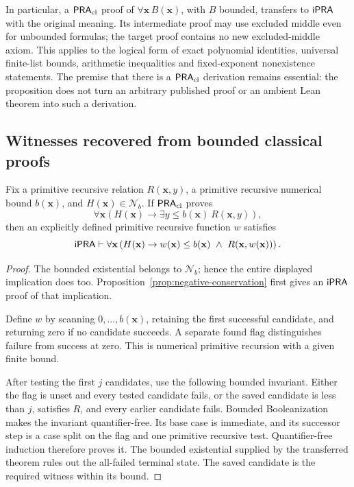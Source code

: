 In particular, a \(\mathsf{PRA}_{\mathrm{cl}}\) proof of
\(\forall\mathbf x\,B(\mathbf x)\), with \(B\) bounded, transfers to
\(\mathsf{iPRA}\) with the original meaning. Its intermediate proof may use
excluded middle even for unbounded formulas; the target proof contains no
new excluded-middle axiom. This applies to the logical form of exact
polynomial identities, universal finite-list bounds, arithmetic inequalities
and fixed-exponent nonexistence statements. The premise that there is a
\(\mathsf{PRA}_{\mathrm{cl}}\) derivation remains essential: the proposition does not turn an
arbitrary published proof or an ambient Lean theorem into such a derivation.

\subsection{Witnesses recovered from bounded classical proofs}

\begin{theorem}
\label{thm:bounded-classical-selector}
Fix a primitive recursive relation \(R(\mathbf x,y)\), a primitive
recursive numerical bound \(b(\mathbf x)\), and
\(H(\mathbf x)\in\mathcal N_b\). If \(\mathsf{PRA}_{\mathrm{cl}}\) proves
\[
 \forall\mathbf x\left(H(\mathbf x)\to
       \exists y\le b(\mathbf x)\ R(\mathbf x,y)\right),
\]
then an explicitly defined primitive recursive function \(w\) satisfies
\[
 \mathsf{iPRA}\vdash\forall\mathbf x\left(H(\mathbf x)\to
       w(\mathbf x)\le b(\mathbf x)\ \land\
       R(\mathbf x,w(\mathbf x))\right).
\]
\end{theorem}

\begin{proof}
The bounded existential belongs to \(\mathcal N_b\); hence the entire
displayed implication does too. Proposition~\ref{prop:negative-conservation}
first gives an \(\mathsf{iPRA}\) proof of that implication.

Define \(w\) by scanning \(0,\ldots,b(\mathbf x)\), retaining the first
successful candidate, and returning zero if no candidate succeeds. A
separate found flag distinguishes failure from success at zero. This is
numerical primitive recursion with a given finite bound.

After testing the first \(j\) candidates, use the following bounded
invariant. Either the flag is unset and every tested candidate fails, or
the saved candidate is less than \(j\), satisfies \(R\), and every earlier
candidate fails. Bounded Booleanization makes the invariant
quantifier-free. Its base case is immediate, and its successor step is a
case split on the flag and one primitive recursive test. Quantifier-free
induction therefore proves it. The bounded existential supplied by the
transferred theorem rules out the all-failed terminal state. The saved
candidate is the required witness within its bound.
\end{proof}

